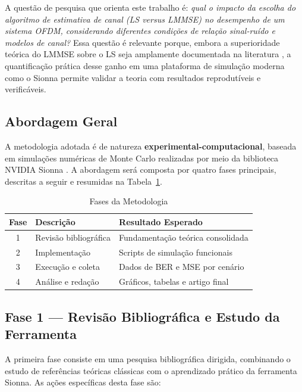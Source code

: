 \documentclass[conference]{IEEEtran}
\begin{document}
A questão de pesquisa que orienta este trabalho é: \textit{qual o impacto da escolha do algoritmo de estimativa de canal (LS versus LMMSE) no desempenho de um sistema OFDM, considerando diferentes condições de relação sinal-ruído e modelos de canal?} Essa questão é relevante porque, embora a superioridade teórica do LMMSE sobre o LS seja amplamente documentada na literatura \cite{edfors1998, hsieh1998}, a quantificação prática desse ganho em uma plataforma de simulação moderna como o Sionna permite validar a teoria com resultados reprodutíveis e verificáveis.

\subsection{Abordagem Geral}

A metodologia adotada é de natureza \textbf{experimental-computacional}, baseada em simulações numéricas de Monte Carlo realizadas por meio da biblioteca NVIDIA Sionna \cite{hoydis2022}. A abordagem será composta por quatro fases principais, descritas a seguir e resumidas na Tabela~\ref{tab:fases}.

\begin{table}[htbp]
\centering
\caption{Fases da Metodologia}
\label{tab:fases}
\begin{tabular}{@{}clp{4.5cm}@{}}
\toprule
\textbf{Fase} & \textbf{Descrição} & \textbf{Resultado Esperado} \\
\midrule
1 & Revisão bibliográfica & Fundamentação teórica consolidada \\
2 & Implementação & Scripts de simulação funcionais \\
3 & Execução e coleta & Dados de BER e MSE por cenário \\
4 & Análise e redação & Gráficos, tabelas e artigo final \\
\bottomrule
\end{tabular}
\end{table}

\subsection{Fase 1 --- Revisão Bibliográfica e Estudo da Ferramenta}

A primeira fase consiste em uma pesquisa bibliográfica dirigida, combinando o estudo de referências teóricas clássicas com o aprendizado prático da ferramenta Sionna. As ações específicas desta fase são:
\end{document}
